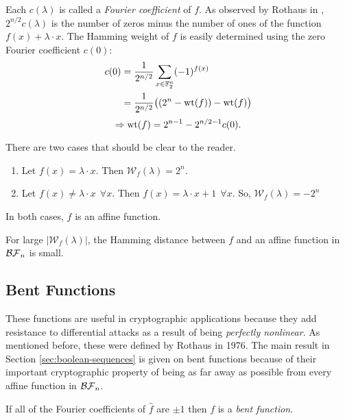 \par Each $c(\lambda)$ is called a \textit{Fourier coefficient} of $f$.
As observed by Rothaus in \cite{art:r76}, $2^{n/2}c(\lambda)$ is the
number of zeros minus the number of ones of the function
$f(x)+\lambda\cdot x$. The Hamming weight of $f$ is easily determined using
the zero Fourier coefficient $c(0)$:
\begin{align*}
  c(0)&=\frac{1}{2^{n/2}}\sum_{x\in\mathbb{F}_2^n}(-1)^{f(x)}\\
  &=\frac{1}{2^{n/2}}\big((2^n-{\rm wt}(f))-{\rm wt}(f)\big)
\end{align*}
\begin{equation}
  \Rightarrow {\rm wt}(f)=2^{n-1}-2^{n/2-1}c(0).
\end{equation}

\begin{example}
  There are two cases that should be clear to the reader.
  \begin{enumerate}[1.]
    \item Let $f(x)=\lambda\cdot x$. Then $\mathcal{W}_f(\lambda)=2^n$.
    \item Let $f(x)\not=\lambda\cdot x \ \ \forall x$. Then $f(x)=
      \lambda\cdot x+1 \ \ \forall x$. So, $\mathcal{W}_f(\lambda)=-2^n$
  \end{enumerate}
  In both cases, $f$ is an affine function.
\end{example}

\par For large $|\mathcal{W}_f(\lambda)|$, the Hamming distance between $f$ and
an affine function in $\mathcal{BF}_n$ is small.

\subsection{Bent Functions}
\par These functions are useful in cryptographic applications because they
add resistance to differential attacks as a result of being \textit{perfectly
nonlinear}. As mentioned before, these were defined by Rothaus in 1976. The main
result in Section \ref{sec:boolean-sequences} is given on bent functions because
of their important cryptographic property of being as far away as possible from
every affine function in $\mathcal{BF}_n$.

\begin{definition}
  If all of the Fourier coefficients of $\hat{f}$ are $\pm1$ then
  $f$ is a \textit{bent function}.
\end{definition}

